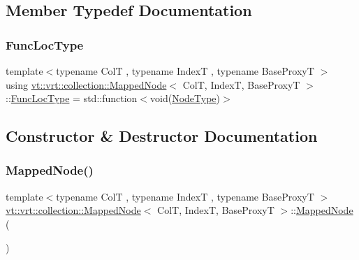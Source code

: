 \subsection{Member Typedef Documentation}
\mbox{\label{structvt_1_1vrt_1_1collection_1_1_mapped_node_af08e7287d3adf47dfca1e4184b82d060}} 
\subsubsection{\texorpdfstring{Func\+Loc\+Type}{FuncLocType}}
{\footnotesize\ttfamily template$<$typename ColT , typename IndexT , typename Base\+ProxyT $>$ \\
using \hyperlink{structvt_1_1vrt_1_1collection_1_1_mapped_node}{vt\+::vrt\+::collection\+::\+Mapped\+Node}$<$ ColT, IndexT, Base\+ProxyT $>$\+::\hyperlink{structvt_1_1vrt_1_1collection_1_1_mapped_node_af08e7287d3adf47dfca1e4184b82d060}{Func\+Loc\+Type} =  std\+::function$<$void(\hyperlink{namespacevt_a866da9d0efc19c0a1ce79e9e492f47e2}{Node\+Type})$>$}



\subsection{Constructor \& Destructor Documentation}
\mbox{\label{structvt_1_1vrt_1_1collection_1_1_mapped_node_a0f996a3267a2e23a946e9696ba9db8a5}} 
\subsubsection{\texorpdfstring{Mapped\+Node()}{MappedNode()}\hspace{0.1cm}{\footnotesize\ttfamily [1/2]}}
{\footnotesize\ttfamily template$<$typename ColT , typename IndexT , typename Base\+ProxyT $>$ \\
\hyperlink{structvt_1_1vrt_1_1collection_1_1_mapped_node}{vt\+::vrt\+::collection\+::\+Mapped\+Node}$<$ ColT, IndexT, Base\+ProxyT $>$\+::\hyperlink{structvt_1_1vrt_1_1collection_1_1_mapped_node}{Mapped\+Node} (\begin{DoxyParamCaption}{ }\end{DoxyParamCaption})\hspace{0.3cm}{\ttfamily [default]}}

